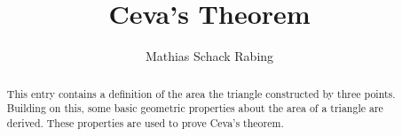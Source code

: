 \documentclass[11pt,a4paper]{article}
\begin{document}
\title{Ceva's Theorem}
\author{Mathias Schack Rabing}
\maketitle

\begin{abstract}
  This entry contains a definition of the area the triangle constructed by three points. Building on this, some basic geometric properties about the area of a triangle are derived. These properties are used to prove Ceva's theorem.
\end{abstract}

\tableofcontents





\end{document}

